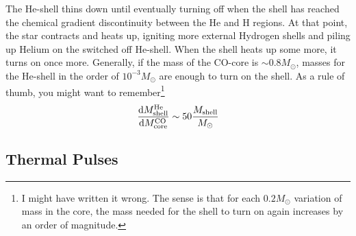 \par The He-shell thins down until eventually turning off when the shell has reached the chemical gradient discontinuity between the He and H regions. At that point, the star contracts and heats up, igniting more external Hydrogen shells and piling up Helium on the switched off He-shell. When the shell heats up some more, it turns on once more. Generally, if the mass of the CO-core is $\sim 0.8M_{\odot}$, masses for the He-shell in the order of $10^{-3}M_{\odot}$ are enough to turn on the shell. As a rule of thumb, you might want to remember\footnote{I might have written it wrong. The sense is that for each $0.2M_{\odot}$ variation of mass in the core, the mass needed for the shell to turn on again increases by an order of magnitude.}
\begin{equation*}
    \frac{\text{d}M_{\text{shell}}^{\text{He}}}{\text{d}M_{\text{core}}^{\text{CO}}} \sim 50 \frac{M_{\text{shell}}}{M_{\odot}}
\end{equation*}

\subsection{Thermal Pulses}

